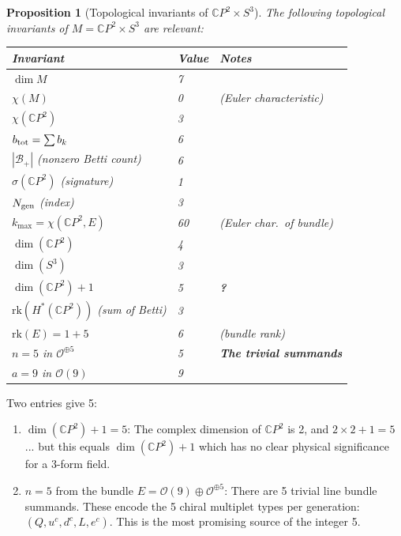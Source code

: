 \documentclass[11pt]{article}
\newtheorem{proposition}[theorem]{Proposition}
\theoremstyle{definition}
\theoremstyle{remark}
\newcommand{\CP}{\mathbb{C}P}
\begin{document}
\begin{proposition}[Topological invariants of $\CP^2 \times S^3$]
\label{prop:invariants}
The following topological invariants of $M = \CP^2 \times S^3$ are relevant:
\begin{center}
\renewcommand{\arraystretch}{1.3}
\begin{tabular}{lll}
\toprule
\textbf{Invariant} & \textbf{Value} & \textbf{Notes} \\
\midrule
$\dim M$ & 7 & \\
$\chi(M)$ & 0 & (Euler characteristic) \\
$\chi(\CP^2)$ & 3 & \\
$b_{\rm tot} = \sum b_k$ & 6 & \\
$|\mathcal{B}_+|$ (nonzero Betti count) & 6 & \\
$\sigma(\CP^2)$ (signature) & 1 & \\
$N_{\rm gen}$ (index) & 3 & \\
$k_{\max} = \chi(\CP^2, E)$ & 60 & (Euler char.\ of bundle) \\
$\dim(\CP^2)$ & 4 & \\
$\dim(S^3)$ & 3 & \\
$\dim(\CP^2) + 1$ & 5 & \textbf{?} \\
$\mathrm{rk}(H^*(\CP^2))$ (sum of Betti) & 3 & \\
$\mathrm{rk}(E) = 1 + 5$ & 6 & (bundle rank) \\
$n = 5$ in $\mathcal{O}^{\oplus 5}$ & 5 & \textbf{The trivial summands} \\
$a = 9$ in $\mathcal{O}(9)$ & 9 & \\
\bottomrule
\end{tabular}
\end{center}
\end{proposition}

Two entries give 5:
\begin{enumerate}
\item $\dim(\CP^2) + 1 = 5$: The complex dimension of $\CP^2$ is 2, and
  $2 \times 2 + 1 = 5$... but this equals $\dim(\CP^2) + 1$ which has no
  clear physical significance for a 3-form field.

\item $n = 5$ from the bundle $E = \mathcal{O}(9) \oplus \mathcal{O}^{\oplus 5}$:
  There are 5 trivial line bundle summands. These encode the 5 chiral
  multiplet types per generation: $(Q, u^c, d^c, L, e^c)$. This is the most
  promising source of the integer 5.
\end{enumerate}
\end{document}
